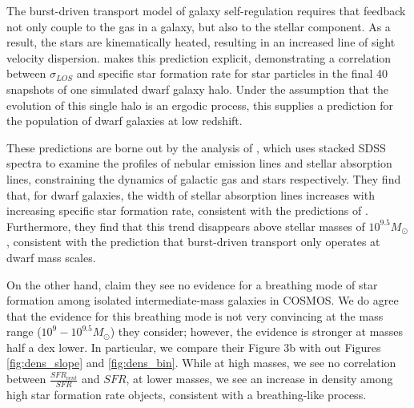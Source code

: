 \documentclass[iop]{emulateapj}
\begin{document}
The burst-driven transport model of galaxy self-regulation requires that feedback not only couple to the gas in a galaxy, but also to the stellar component. As a result, the stars are kinematically heated, resulting in an increased line of sight velocity dispersion. \cite{El-Badry17} makes this prediction explicit, demonstrating a correlation between $\sigma_{LOS}$ and specific star formation rate for star particles in the final 40 snapshots of one simulated dwarf galaxy halo. Under the assumption that the evolution of this single halo is an ergodic process, this supplies a prediction for the population of dwarf galaxies at low redshift.

These predictions are borne out by the analysis of \cite{Cicone16}, which uses stacked SDSS spectra to examine the profiles of nebular emission lines and stellar absorption lines, constraining the dynamics of galactic gas and stars respectively. They find that, for dwarf galaxies, the width of stellar absorption lines increases with increasing specific star formation rate, consistent with the predictions of \cite{El-Badry17}. Furthermore, they find that this trend disappears above stellar masses of $10^{9.5} M_{\odot}$, consistent with the prediction that burst-driven transport only operates at dwarf mass scales.

On the other hand, \cite{Patel18} claim they see no evidence for a breathing mode of star formation among isolated intermediate-mass galaxies in COSMOS. We do agree that the evidence for this breathing mode is not very convincing at the mass range ($10^{9}-10^{9.5} M_{\odot}$) they consider; however, the evidence is stronger at masses half a dex lower. In particular, we compare their Figure 3b with out Figures \ref{fig:dens_slope} and \ref{fig:dens_bin}. While at high masses, we see no correlation between $\frac{SFR_{cent}}{SFR}$ and $SFR$, at lower masses, we see an increase in density among high star formation rate objects, consistent with a breathing-like process.
\end{document}
